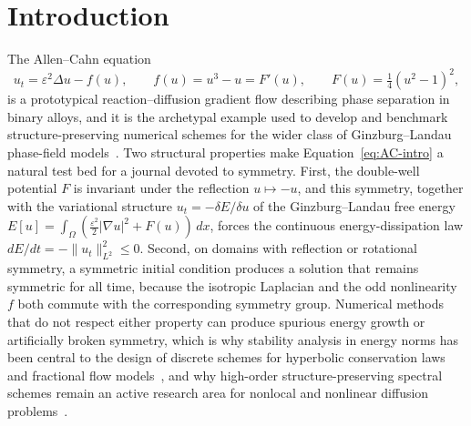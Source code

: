 \documentclass[symmetry,article,submit,moreauthors]{Definitions/mdpi}
\begin{document}
\section{Introduction}

The Allen--Cahn equation~\cite{AllenCahn}
\begin{equation}\label{eq:AC-intro}
u_t = \varepsilon^2 \Delta u - f(u), \qquad f(u) = u^3-u = F'(u), \qquad F(u)=\tfrac14(u^2-1)^2,
\end{equation}
is a prototypical reaction--diffusion gradient flow describing phase separation in binary alloys, and it is the archetypal example used to develop and benchmark structure-preserving numerical schemes for the wider class of Ginzburg--Landau phase-field models~\cite{Du_review}. Two structural properties make Equation~\eqref{eq:AC-intro} a natural test bed for a journal devoted to symmetry. First, the double-well potential $F$ is invariant under the reflection $u\mapsto-u$, and this symmetry, together with the variational structure $u_t=-\delta E/\delta u$ of the Ginzburg--Landau free energy $E[u]=\int_\Omega(\frac{\varepsilon^2}{2}|\nabla u|^2+F(u))\,dx$, forces the continuous energy-dissipation law $dE/dt=-\|u_t\|^2_{L^2}\le0$. Second, on domains with reflection or rotational symmetry, a symmetric initial condition produces a solution that remains symmetric for all time, because the isotropic Laplacian and the odd nonlinearity $f$ both commute with the corresponding symmetry group. Numerical methods that do not respect either property can produce spurious energy growth or artificially broken symmetry, which is why stability analysis in energy norms has been central to the design of discrete schemes for hyperbolic conservation laws~\cite{Baishemirov_Symmetry} and fractional flow models~\cite{Baigereyev_Math}, and why high-order structure-preserving spectral schemes remain an active research area for nonlocal and nonlinear diffusion problems~\cite{Shiyapov2026}.
\end{document}
